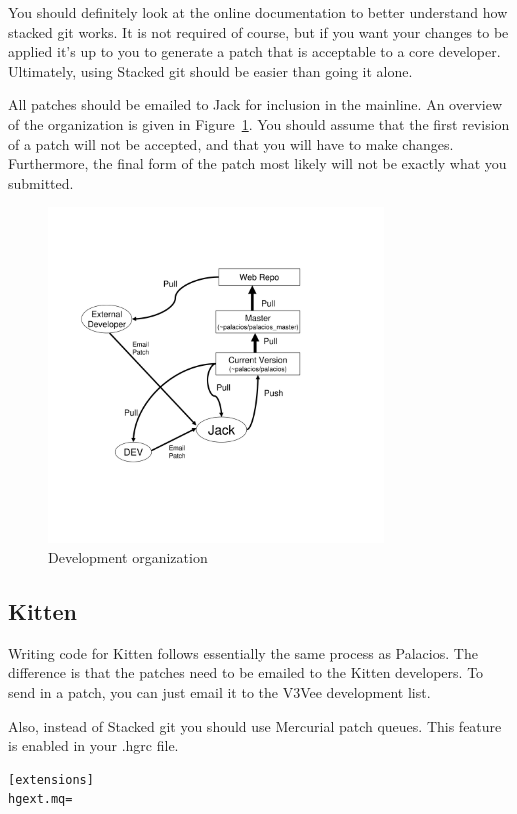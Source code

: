 \documentclass[11pt]{article}
\begin{document}
You should definitely look at the online documentation to better
understand how stacked git works. It is not required of course, but if
you want your changes to be applied it's up to you to generate a patch
that is acceptable to a core developer. Ultimately, using Stacked git
should be easier than going it alone.


All patches should be emailed to Jack for inclusion in the
mainline. An overview of the organization is given in
Figure~\ref{fig:process}. You should assume that the first revision of
a patch will not be accepted, and that you will have to make
changes. Furthermore, the final form of the patch most likely will not
be exactly what you submitted. 

 
\begin{figure}[t]
\begin{center}
\includegraphics[height=3.5in]{dev_chart.pdf}
\end{center}
\caption{Development organization}
\label{fig:process}
\end{figure}


\subsection{Kitten}

Writing code for Kitten follows essentially the same process as
Palacios. The difference is that the patches need to be emailed to the
Kitten developers. To send in a patch, you can just email it to the
V3Vee development list.


Also, instead of Stacked git you should use Mercurial patch
queues. This feature is enabled in your .hgrc file.
\begin{verbatim}
[extensions]
hgext.mq=
\end{verbatim}
\end{document}
